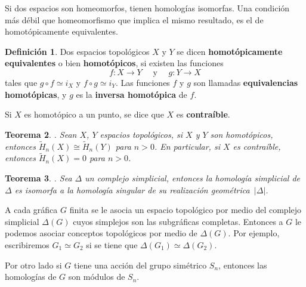 \documentclass[12pt]{book}
\newtheorem{theorem}{Teorema}[section]
\theoremstyle{definition}
\newtheorem{definition}[theorem]{Definición}
\newcounter{in}
\newcounter{ini}
\begin{document}
Si dos espacios son homeomorfos, tienen homologías isomorfas. Una
condición más débil que homeomorfismo que implica el mismo resultado,
es el de homotópicamente equivalentes.
 
\begin{definition}
  Dos espacios topológicos $X$ y $Y$ se dicen \textbf{homotópicamente
    equivalentes} o bien \textbf{homotópicos}, si existen las funciones
  $$f:X\rightarrow Y \quad \mbox{ y }\quad g:Y\rightarrow X$$
  tales que $g\circ f\simeq i_{X}$ y $f\circ g\simeq i_{Y}$. Las
  funciones $f$ y $g$ son llamadas\textbf{ equivalencias homotópicas},
  y $g$ es la \textbf{inversa homotópica} de $f$. 
\end{definition}
Si $X$ es homotópico a un punto, se dice que $X$ es
\textbf{contraíble}.

\begin{theorem}{}.
  Sean $X$, $Y$ espacios topológicos, si $X$ y $Y$ son homotópicos, entonces $\widetilde H_{n}(X)\cong \widetilde
  H_{n}(Y)$ para $n>0$. En particular, si $X$ es contraíble, entonces $\widetilde
  H_{n}(X)=0$ para $n>0$.
  \label{esp-homotopicos-homologias-iso}
\end{theorem}

\begin{theorem}{}.
  Sea $\Delta$ un complejo simplicial, entonces la homología
  simplicial de $\Delta$ es isomorfa a la homología singular de su
  realización geométrica~$|\Delta|$.
  \label{homologia-realizacion}
\end{theorem}
 
A cada gráfica $G$ finita se le asocia un espacio topológico por
medio del complejo simplicial $\Delta(G)$ cuyos simplejos son
las subgráficas completas. Entonces a $G$ le podemos asociar conceptos topológicos por
medio de $\Delta(G)$. Por ejemplo, escribiremos $G_{1}\simeq G_{2}$ si
se tiene que $\Delta(G_{1})\simeq\Delta(G_{2})$.

Por otro lado si $G$ tiene una acción del grupo simétrico
$S_{n}$, entonces las homologías de $G$ son módulos
de $S_{n}$.
\end{document}
